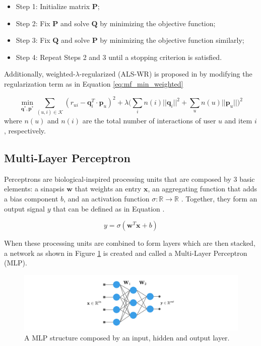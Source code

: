     \begin{itemize}
        \item Step 1: Initialize matrix $\mathbf{P}$;
        \item Step 2: Fix $\mathbf{P}$ and solve $\mathbf{Q}$ by minimizing the objective function;
        \item Step 3: Fix $\mathbf{Q}$ and solve $\mathbf{P}$ by minimizing the objective function similarly;
        \item Step 4: Repeat Steps 2 and 3 until a stopping criterion is satisfied.
    \end{itemize}
    
    Additionally, weighted-$\lambda$-regularized (ALS-WR) is proposed in \cite{2008ALSWR} by modifying the regularization term as in Equation \ref{eq:mf_min_weighted}
    
    \begin{equation}
        \label{eq:mf_min_weighted}
        \min_{\mathbf{q}^*, \mathbf{p}^*} \sum_{(u,i) \in \mathcal{K}} (r_{ui} - \mathbf{q}^T_i \cdot \mathbf{p}_u)^2 + \lambda \Big(\sum_i n(i)||\mathbf{q}_i||^2 + \sum_u n(u)||\mathbf{p}_u||\Big)^2
    \end{equation} where $n(u)$ and $n(i)$ are the total number of interactions of user $u$ and item $i$, respectively.

\subsection{Multi-Layer Perceptron}

     Perceptrons are biological-inspired processing units that are composed by 3 basic elements: a sinapsis $\mathbf{w}$ that weights an entry $\mathbf{x}$, an aggregating function that adds a bias component $b$, and an activation function $\sigma: \mathbb{R} \rightarrow \mathbb{R}$ \cite{Rosenblatt58theperceptron}. Together, they form an output signal $y$ that can be defined as in Equation \label{eq:perceptron}.
     
     \begin{equation}
        y = \sigma (\mathbf{w}^T \mathbf{x} + b)
         \label{eq:perceptron}
     \end{equation}
     
    When these processing units are combined to form layers which are then stacked, a network as shown in Figure \ref{fig:mlp} is created and called a Multi-Layer Perceptron (MLP). 
    
    \begin{figure}[ht]
        \centering
        \includegraphics[width=\textwidth]{figs/mlp.png}
        \caption{A MLP structure composed by an input, hidden and output layer.}
        \label{fig:mlp}
    \end{figure}
    
